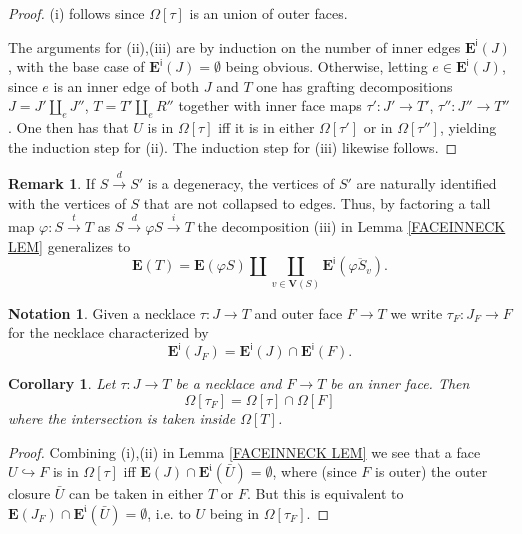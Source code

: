 \documentclass[a4paper,10pt
,draft
]{article}%
\numberwithin{equation}{section}
\numberwithin{figure}{section}
\newtheorem{corollary}[equation]{Corollary}%
\theoremstyle{definition} %
\newtheorem{remark}[equation]{Remark}%
\newtheorem{notation}[equation]{Notation}%
\newcommand{\1}{\ensuremath{\mathbbm 1}}%
\begin{document}
\begin{proof}
	(i) follows since $\Omega[\tau]$ is an union of outer faces.
	
	The arguments for (ii),(iii) are by induction on the number of inner edges $\boldsymbol{E}^{\mathsf{i}}(J)$,
	with the base case of $\boldsymbol{E}^{\mathsf{i}}(J) = \emptyset$  being obvious.
%	
	Otherwise, letting $e \in \boldsymbol{E}^{\mathsf{i}}(J)$, since $e$ is an inner edge of
	both $J$ and $T$
	one has grafting decompositions
	$J = J' \amalg_e J''$,
	$T = T' \amalg_e R''$
	together with inner face maps
	$\tau' \colon J' \to T'$,
	$\tau'' \colon J'' \to T''$.
%
	One then has that 
	$U$ is in $\Omega[\tau]$
	iff it is in either
	$\Omega[\tau']$ or in $\Omega[\tau'']$,
	yielding the induction step for (ii).
	The induction step for (iii) likewise follows. 
\end{proof}



\begin{remark}
	If $S \xrightarrow{d} S'$
	is a degeneracy,
	the vertices of $S'$ are naturally identified with
	the vertices of $S$ that are not collapsed to edges.
	Thus, by factoring a tall map
	$\varphi \colon S \xrightarrow{t} T$ as
	$S \xrightarrow{d} \varphi S \xrightarrow{i} T$
	the decomposition (iii) in Lemma \ref{FACEINNECK LEM}
	generalizes to 
\begin{equation}\label{EDGEBREAK EQ}
	\boldsymbol{E}(T) = 
	\boldsymbol{E}(\varphi S) \amalg 
	\coprod_{v \in \boldsymbol{V}(S)}
	\boldsymbol{E}^{\mathsf{i}}(\overline{\varphi S_v}).
\end{equation}
\end{remark}



\begin{notation}
	Given a necklace
	$\tau \colon J \to T$
	and outer face $F \to T$
	we write 
	$\tau_F \colon J_F \to F$
	for the necklace characterized by
\[
	\boldsymbol{E}^{\mathsf{i}}(J_F)
	=
	\boldsymbol{E}^{\mathsf{i}}(J)
	\cap
	\boldsymbol{E}^{\mathsf{i}}(F).
\]
\end{notation}



\begin{corollary}\label{NECINT COR}
	Let $\tau \colon J \to T$ be a necklace and
	$F \to T$ be an inner face.
	Then
\[
	\Omega[\tau_F] = \Omega[\tau] \cap \Omega[F]
\]
	where the intersection is taken inside
	$\Omega[T]$.
\end{corollary}

\begin{proof}
	Combining (i),(ii) in 
	Lemma \ref{FACEINNECK LEM}
	we see that a face $U \hookrightarrow F$ is
	in $\Omega[\tau]$
	iff $\boldsymbol{E}(J) \cap 
	\boldsymbol{E}^{\mathfrak{i}}(\bar{U}) = \emptyset$,
	where (since $F$ is outer) the outer closure $\bar{U}$
	can be taken in either $T$ or $F$.
	But this is equivalent to 
	$\boldsymbol{E}(J_F) \cap 
	\boldsymbol{E}^{\mathfrak{i}}(\bar{U}) = \emptyset$,
	i.e. to $U$ being in $\Omega[\tau_F]$.
\end{proof}
\end{document}
